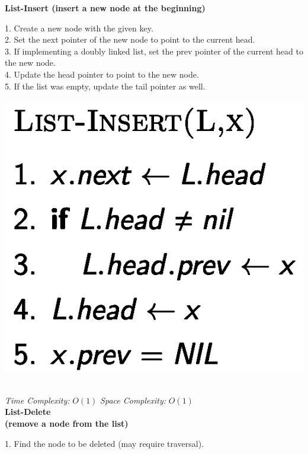 {\begin{minipage}[t]{0.45\textwidth}
    \textbf{\scriptsize List-Insert (insert a new node at the beginning)}\\
    \begin{minipage}[htp]{0.65\textwidth}
        \scriptsize
        1. Create a new node with the given key.\\
        2. Set the next pointer of the new node to point to the current head.\\
        3. If implementing a doubly linked list, set the prev pointer of the current head to the new node.\\
        4. Update the head pointer to point to the new node.\\
        5. If the list was empty, update the tail pointer as well.
    \end{minipage}
    \begin{minipage}[htp]{0.3\textwidth}
        \begin{center}
            \includegraphics[width=0.9\linewidth]{images/list-insert.png}
        \end{center}
    \end{minipage}\\
    \textit{Time Complexity:} \(O(1)\) \quad \textit{Space Complexity:} \(O(1)\)\\
    \textbf{\scriptsize List-Delete \\(remove a node from the list)}\\
    \begin{minipage}[htp]{0.65\textwidth}
        \scriptsize
        1. Find the node to be deleted (may require traversal).\\

\end{minipage}
\end{minipage}}
